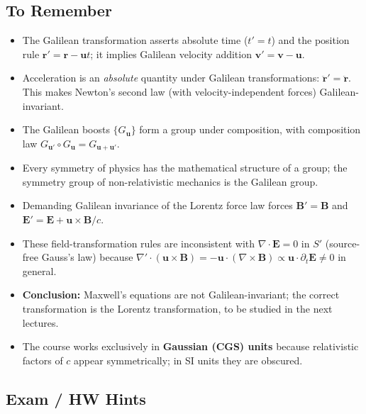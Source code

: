 \subsection*{To Remember}

\begin{itemize}
  \item The Galilean transformation asserts absolute time ($t' = t$)
    and the position rule $\mathbf{r}' = \mathbf{r} - \mathbf{u}t$;
    it implies Galilean velocity addition
    $\mathbf{v}' = \mathbf{v} - \mathbf{u}$.
  \item Acceleration is an \emph{absolute} quantity under Galilean
    transformations: $\ddot{\mathbf{r}}' = \ddot{\mathbf{r}}$.
    This makes Newton's second law (with velocity-independent forces)
    Galilean-invariant.
  \item The Galilean boosts $\{G_{\mathbf{u}}\}$ form a group under
    composition, with composition law
    $G_{\mathbf{u}'}\circ G_{\mathbf{u}} = G_{\mathbf{u}+\mathbf{u}'}$.
  \item Every symmetry of physics has the mathematical structure of a
    group; the symmetry group of non-relativistic mechanics is the
    Galilean group.
  \item Demanding Galilean invariance of the Lorentz force law forces
    $\mathbf{B}' = \mathbf{B}$ and
    $\mathbf{E}' = \mathbf{E} + \mathbf{u}\times\mathbf{B}/c$.
  \item These field-transformation rules are inconsistent with
    $\nabla\cdot\mathbf{E}=0$ in $S'$ (source-free Gauss's law) because
    $\nabla'\cdot(\mathbf{u}\times\mathbf{B}) = -\mathbf{u}\cdot
    (\nabla\times\mathbf{B}) \propto \mathbf{u}\cdot\partial_t\mathbf{E}
    \neq 0$ in general.
  \item \textbf{Conclusion:} Maxwell's equations are not
    Galilean-invariant; the correct transformation is the Lorentz
    transformation, to be studied in the next lectures.
  \item The course works exclusively in \textbf{Gaussian (CGS) units}
    because relativistic factors of $c$ appear symmetrically; in SI
    units they are obscured.
\end{itemize}

\subsection*{Exam / HW Hints}

